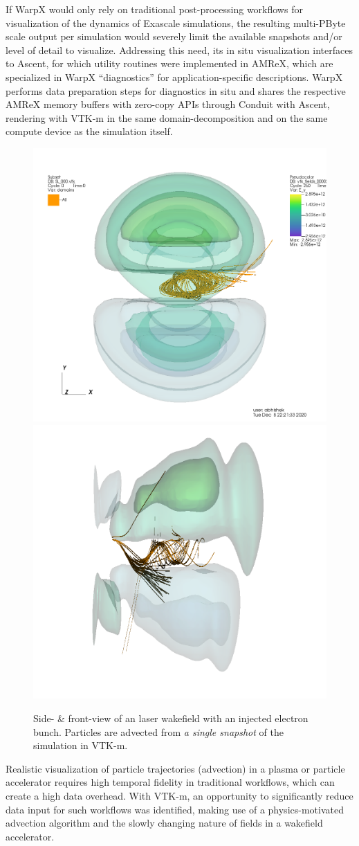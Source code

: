 If WarpX would only rely on traditional post-processing workflows for visualization of the dynamics of Exascale simulations, the resulting multi-PByte scale output per simulation would severely limit the available snapshots and/or level of detail to visualize.
Addressing this need, its in situ visualization interfaces to Ascent, for which utility routines were implemented in AMReX, which are specialized in WarpX ``diagnostics'' for application-specific descriptions.
WarpX performs data preparation steps for diagnostics in situ and shares the respective AMReX memory buffers with zero-copy APIs through Conduit with Ascent, rendering with VTK-m in the same domain-decomposition and on the same compute device as the simulation itself.

\begin{figure}[ht]
  \centering
  \includegraphics[width=0.49\linewidth]{figures/lwfa_particle_advection_front.png}%
  \includegraphics[width=0.49\linewidth]{figures/lwfa_particle_advection_side.png}
  \caption{Side- \& front-view of an laser wakefield with an injected electron bunch.
  Particles are advected from \emph{a single snapshot} of the simulation in VTK-m.}
  \label{fig:lwfa_particle_advection}
\end{figure}

Realistic visualization of particle trajectories (advection) in a plasma or particle accelerator requires high temporal fidelity in traditional workflows, which can create a high data overhead.
With VTK-m, an opportunity to significantly reduce data input for such workflows was identified, making use of a physics-motivated advection algorithm and the slowly changing nature of fields in a wakefield accelerator.

